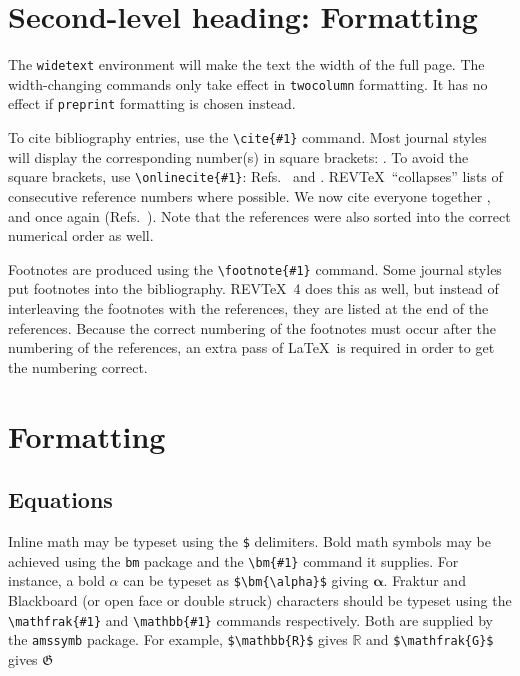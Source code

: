 \documentclass[aps,prl,twocolumn,superscriptaddress,groupedaddress]{revtex4}  %
\begin{document}
\section{\label{sec:level2}Second-level heading: Formatting}

The \texttt{widetext} environment will make the text the width of the
full page.  The width-changing commands only take effect in \texttt{twocolumn}
formatting. It has no effect if \texttt{preprint} formatting is chosen
instead.

To cite bibliography entries, use the \verb+\cite{#1}+ command. Most
journal styles will display the corresponding number(s) in square
brackets: \cite{Glauber1963}. To avoid the square brackets, use
\verb+\onlinecite{#1}+: Refs.~ and
. REV\TeX\ ``collapses'' lists of
consecutive reference numbers where possible. We now cite everyone
together \cite{Ehrenfest, Robertson, Arfken}, and once again
(Refs.~). Note that the references
were also sorted into the correct numerical order as well.

Footnotes are produced using the \verb+\footnote{#1}+ command. 
Some journal styles put footnotes into the bibliography. REV\TeX~4 does
this as well, but instead of interleaving the footnotes with the
references, they are listed at the end of the references. Because the correct
numbering of the footnotes must occur after the numbering of the
references, an extra pass of \LaTeX\ is required in order to get the
numbering correct.

\section{Formatting} 

\subsection{Equations} 

Inline math may be typeset using the \verb+$+ delimiters. Bold math
symbols may be achieved using the \verb+bm+ package and the
\verb+\bm{#1}+ command it supplies. For instance, a bold $\alpha$ can
be typeset as \verb+$\bm{\alpha}$+ giving $\bm{\alpha}$. Fraktur and
Blackboard (or open face or double struck) characters should be
typeset using the \verb+\mathfrak{#1}+ and \verb+\mathbb{#1}+ commands
respectively. Both are supplied by the \texttt{amssymb} package. For
example, \verb+$\mathbb{R}$+ gives $\mathbb{R}$ and
\verb+$\mathfrak{G}$+ gives $\mathfrak{G}$
\end{document}

